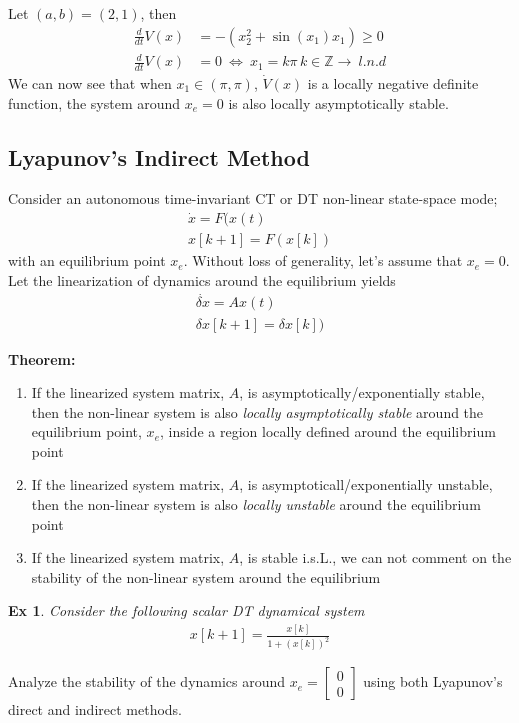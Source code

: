 \documentclass[twoside]{article}
\newtheorem{exmp}[theorem]{Ex}
\begin{document}
%
Let $(a,b) = (2,1)$, then 
\begin{align*}
\frac{d}{dt} V(x) &= - \left( x_2^2  + \sin(x_1) x_1 \right) \geq 0
\\
\frac{d}{dt} V(x) &= 0 \ \iff \ x_1 = k \pi \, k \in \mathbb{Z} \rightarrow \ l.n.d 
\end{align*}
%
We can now see that when $x_1 \in (\pi , \pi)$, $\dot{V}(x)$ is a locally negative 
definite function, the system around $x_e = 0$ is also locally asymptotically stable. 

\subsection{Lyapunov's Indirect Method}

Consider an autonomous time-invariant CT or DT non-linear state-space mode;
%
\begin{align*}
    \dot{x} = F(x(t) \\
    x[k+1] = F(x[k]) 
\end{align*}
%
with an equilibrium point $x_e$. Without loss of generality, let's assume that $x_e = 0$. Let the linearization of dynamics around the equilibrium yields
%
\begin{align*}
    \dot{\delta x} = A x(t) \\
    \delta x[k+1] = \delta x[k]) 
\end{align*}
%

\textbf{Theorem:} 
\begin{enumerate}
    \item If the linearized system matrix, $A$, is asymptotically/exponentially stable, then the non-linear system
    is also \textit{locally asymptotically stable} around the equilibrium point, $x_e$, inside a region locally defined around the equilibrium point
    \item If the linearized system matrix, $A$, is asymptoticall/exponentially unstable, then the non-linear system
    is also \textit{locally unstable} around the equilibrium point
    \item If the linearized system matrix, $A$, is stable i.s.L., we can not comment on the stability of the non-linear system around the equilibrium 
\end{enumerate}

\begin{exmp}
    Consider the following scalar DT dynamical system
    \begin{align*}
    x[k+1] = \frac{x[k]}{1 + (x[k])^2}
\end{align*}
\end{exmp}
Analyze the stability of the dynamics around $x_e = \begin{bmatrix} 0 \\ 0 \end{bmatrix}$ using both Lyapunov's direct and indirect methods.
\end{document}
